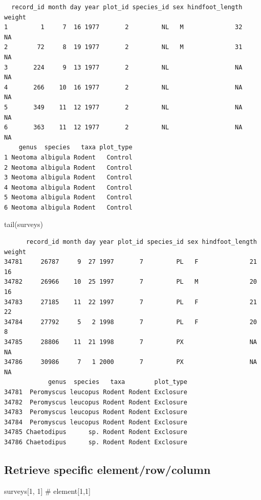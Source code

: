 \documentclass[
  letterpaper,
  DIV=11,
  numbers=noendperiod]{scrreprt}
\newenvironment{Shaded}{\begin{snugshade}}{\end{snugshade}}
\newcommand{\CommentTok}[1]{\textcolor[rgb]{0.37,0.37,0.37}{#1}}
\newcommand{\DecValTok}[1]{\textcolor[rgb]{0.68,0.00,0.00}{#1}}
\newcommand{\FunctionTok}[1]{\textcolor[rgb]{0.28,0.35,0.67}{#1}}
\newcommand{\NormalTok}[1]{\textcolor[rgb]{0.00,0.23,0.31}{#1}}
\begin{document}
\begin{verbatim}
  record_id month day year plot_id species_id sex hindfoot_length weight
1         1     7  16 1977       2         NL   M              32     NA
2        72     8  19 1977       2         NL   M              31     NA
3       224     9  13 1977       2         NL                  NA     NA
4       266    10  16 1977       2         NL                  NA     NA
5       349    11  12 1977       2         NL                  NA     NA
6       363    11  12 1977       2         NL                  NA     NA
    genus  species   taxa plot_type
1 Neotoma albigula Rodent   Control
2 Neotoma albigula Rodent   Control
3 Neotoma albigula Rodent   Control
4 Neotoma albigula Rodent   Control
5 Neotoma albigula Rodent   Control
6 Neotoma albigula Rodent   Control
\end{verbatim}

\begin{Shaded}
\begin{Highlighting}[]
\FunctionTok{tail}\NormalTok{(surveys)}
\end{Highlighting}
\end{Shaded}

\begin{verbatim}
      record_id month day year plot_id species_id sex hindfoot_length weight
34781     26787     9  27 1997       7         PL   F              21     16
34782     26966    10  25 1997       7         PL   M              20     16
34783     27185    11  22 1997       7         PL   F              21     22
34784     27792     5   2 1998       7         PL   F              20      8
34785     28806    11  21 1998       7         PX                  NA     NA
34786     30986     7   1 2000       7         PX                  NA     NA
            genus  species   taxa        plot_type
34781  Peromyscus leucopus Rodent Rodent Exclosure
34782  Peromyscus leucopus Rodent Rodent Exclosure
34783  Peromyscus leucopus Rodent Rodent Exclosure
34784  Peromyscus leucopus Rodent Rodent Exclosure
34785 Chaetodipus      sp. Rodent Rodent Exclosure
34786 Chaetodipus      sp. Rodent Rodent Exclosure
\end{verbatim}

\subsection{Retrieve specific
element/row/column}\label{retrieve-specific-elementrowcolumn}

\begin{Shaded}
\begin{Highlighting}[]
\NormalTok{surveys[}\DecValTok{1}\NormalTok{, }\DecValTok{1}\NormalTok{] }\CommentTok{\# element[1,1]}
\end{Highlighting}
\end{Shaded}
\end{document}
